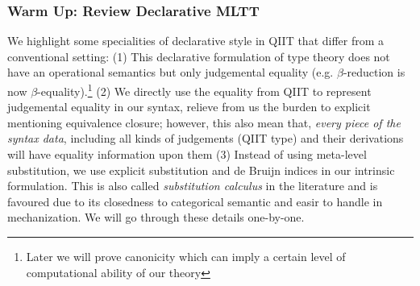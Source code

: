 
\subsubsection{\textbf{Warm Up: Review Declarative MLTT}}

We highlight some specialities of declarative style in QIIT that differ from a
conventional setting: 
(1) This declarative formulation of type theory does not
have an operational semantics but only judgemental equality (e.g. $\beta$-reduction is now $\beta$-equality).\footnote{Later we will prove
canonicity which can imply a certain level of computational ability of
our theory} 
(2) We directly use the equality from QIIT to represent judgemental equality in our syntax, relieve from us the burden to explicit mentioning equivalence closure; however, this also mean that, \textit{every piece of the syntax data}, including all kinds of judgements (QIIT type) and their derivations will have equality information upon them  
(3) Instead of using meta-level substitution, we use explicit
substitution and de Bruijn indices in our intrinsic formulation. This is
also called \textit{substitution calculus} in the literature and is favoured due
to its closedness to categorical semantic and easir to handle in mechanization. We will go through these details one-by-one.




\newcommand\mathboxtext[1]{
  \fcolorbox{black}{faint-gray}{\ensuremath{#1}}
}

